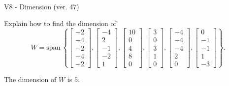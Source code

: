 \begin{exercise}
  \begin{exerciseTitle}V8 - Dimension (ver. 47)\end{exerciseTitle}
  \begin{exerciseStatement}
    Explain how to find the dimension of 
\[W=\mathrm{span}\ \left\{\left[\begin{array}{r}
-2 \\
-4 \\
-2 \\
-4 \\
-2
\end{array}\right] , \left[\begin{array}{r}
-4 \\
2 \\
-1 \\
-2 \\
1
\end{array}\right] , \left[\begin{array}{r}
10 \\
0 \\
4 \\
8 \\
0
\end{array}\right] , \left[\begin{array}{r}
3 \\
0 \\
3 \\
1 \\
0
\end{array}\right] , \left[\begin{array}{r}
-4 \\
-4 \\
-4 \\
2 \\
0
\end{array}\right] , \left[\begin{array}{r}
0 \\
-1 \\
-1 \\
1 \\
-3
\end{array}\right]\right\}.\]



  \end{exerciseStatement}
  \begin{exerciseAnswer}
   The dimension of \(W\) is  \(5\).
  


  \end{exerciseAnswer}
\end{exercise}